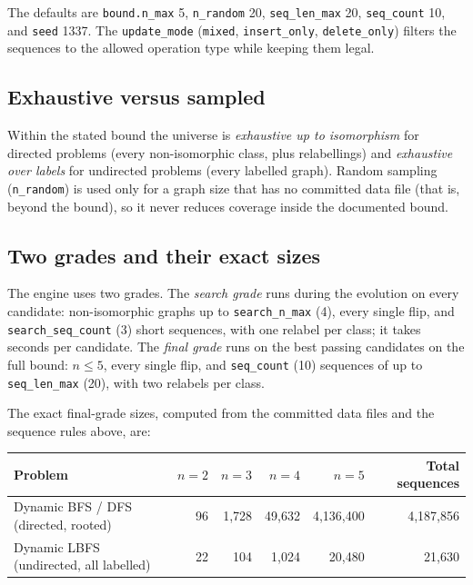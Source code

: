 The defaults are \texttt{bound.n\_max} 5, \texttt{n\_random} 20,
\texttt{seq\_len\_max} 20, \texttt{seq\_count} 10, and \texttt{seed} 1337. The
\texttt{update\_mode} (\texttt{mixed}, \texttt{insert\_only},
\texttt{delete\_only}) filters the sequences to the allowed operation type while
keeping them legal.

\subsection{Exhaustive versus sampled}

Within the stated bound the universe is \emph{exhaustive up to isomorphism} for
directed problems (every non-isomorphic class, plus relabellings) and
\emph{exhaustive over labels} for undirected problems (every labelled graph).
Random sampling (\texttt{n\_random}) is used only for a graph size that has no
committed data file (that is, beyond the bound), so it never reduces coverage
inside the documented bound.

\subsection{Two grades and their exact sizes}

The engine uses two grades. The \emph{search grade} runs during the evolution on
every candidate: non-isomorphic graphs up to \texttt{search\_n\_max} (4), every
single flip, and \texttt{search\_seq\_count} (3) short sequences, with one
relabel per class; it takes seconds per candidate. The \emph{final grade} runs on
the best passing candidates on the full bound: $n \le 5$, every single flip, and
\texttt{seq\_count} (10) sequences of up to \texttt{seq\_len\_max} (20), with two
relabels per class.

The exact final-grade sizes, computed from the committed data files and the
sequence rules above, are:

\begin{center}
\footnotesize
\setlength{\tabcolsep}{6pt}
\begin{tabular}{@{}lrrrrr@{}}
\toprule
Problem & $n{=}2$ & $n{=}3$ & $n{=}4$ & $n{=}5$ & Total sequences \\
\midrule
Dynamic BFS / DFS (directed, rooted) & 96 & 1{,}728 & 49{,}632 & 4{,}136{,}400 & 4{,}187{,}856 \\
Dynamic LBFS (undirected, all labelled) & 22 & 104 & 1{,}024 & 20{,}480 & 21{,}630 \\
\bottomrule
\end{tabular}
\end{center}

